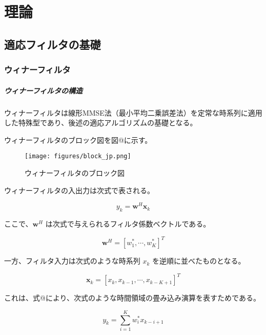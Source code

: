 \chapter{理論}\label{theory}

\section{適応フィルタの基礎}\label{basis-adf}

\subsection{ウィナーフィルタ}\label{wiener}

\paragraph{ウィナーフィルタの構造}\label{wiener-structure}

ウィナーフィルタは線形MMSE法（最小平均二乗誤差法）を定常な時系列に適用した特殊型であり、後述の適応アルゴリズムの基礎となる。

ウィナーフィルタのブロック図を図@に示す。

\begin{figure}
\centering
\texttt{[image: figures/block\_jp.png]}
\caption{ウィナーフィルタのブロック図}
\label{block_jp}
\end{figure}


ウィナーフィルタの入出力は次式で表される。

\begin{equation}
y_k = \bm{w}^H \bm{x}_k
\end{equation}

ここで、\( \bm{w}^H\) は次式で与えられるフィルタ係数ベクトルである。

\begin{equation}
\bm{w}^H = [w_1^*, \cdots, w_{K}^*]^T
\end{equation}

一方、フィルタ入力は次式のような時系列 \({x_k}\)
を逆順に並べたものとなる。

\begin{equation}
\bm{x}_k = [x_k, x_{k-1}, \cdots, x_{k-K+1}]^T
\end{equation}

これは、式@により、次式のような時間領域の畳み込み演算を表すためである。

\begin{equation}
y_k = \sum_{i=1}^K w_i^* x_{k-i+1}
\end{equation}

